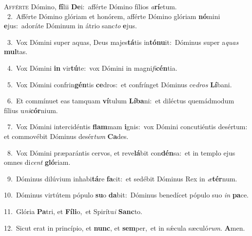 \lettrine{\initial\textcolor{\initialcolor}{A}}{fférte} Dómino, \textbf{fí}\-lii \textbf{De}\-i:~\star afférte Dómino fílios \textit{a}\-\textbf{rí}etum.\\
{\numbfont\textcolor{\numbcolor}{~2.}}~Afférte Dómino glóriam et honórem, afférte Dómino glóriam \textbf{nó}\-mini \textbf{e}\-jus:~\star adoráte Dóminum in átrio sanc\textit{to} \textbf{e}\-jus.\par
{\numbfont\textcolor{\numbcolor}{~3.}}~Vox Dómini super aquas, Deus majes\-\textbf{tá}\-tis in\-\textbf{tó}\-\textbf{nu}it:~\star Dóminus super a\textit{quas} \textbf{mul}\-tas.\par
{\numbfont\textcolor{\numbcolor}{~4.}}~Vox Dómini \textbf{in} vir\-\textbf{tú}\-te:~\star vox Dómini in magni\-\textit{fi}\-\textbf{cén}tia.\par
{\numbfont\textcolor{\numbcolor}{~5.}}~Vox Dómini confrin\-\textbf{gén}\-tis \textbf{ce}\-dros:~\star et confrínget Dóminus ce\textit{dros} \textbf{Lí}\-bani.\par
{\numbfont\textcolor{\numbcolor}{~6.}}~Et commínuet eas tamquam \textbf{ví}\-tulum \textbf{Lí}\-\textbf{ba}ni:~\star et diléctus quemádmodum fílius u\-\textit{ni}\-\textbf{cór}nium.\par
{\numbfont\textcolor{\numbcolor}{~7.}}~Vox Dómini intercidéntis \textbf{flam}\-mam \textbf{i}\-gnis:~\star vox Dómini concutiéntis desértum: et commovébit Dóminus desér\textit{tum} \textbf{Ca}\-des.\par
{\numbfont\textcolor{\numbcolor}{~8.}}~Vox Dómini præparántis cervos, et reve\-\textbf{lá}\-bit con\-\textbf{dén}\-sa:~\star et in templo ejus omnes di\textit{cent} \textbf{gló}\-riam.\par
{\numbfont\textcolor{\numbcolor}{~9.}}~Dóminus dilúvium inhabi\-\textbf{tá}\-re \textbf{fa}\-cit:~\star et sedébit Dóminus Rex in \textit{æ}\-\textbf{tér}num.\par
{\numbfont\textcolor{\numbcolor}{10.}}~Dóminus virtútem pópulo \textbf{su}\-o \textbf{da}\-bit:~\star Dóminus benedícet pópulo suo \textit{in} \textbf{pa}\-ce.\par
{\numbfont\textcolor{\numbcolor}{11.}}~Glória \textbf{Pa}\-tri, et \textbf{Fí}\-\textbf{li}o,~\star et Spirítu\textit{i} \textbf{Sanc}\-to.\par
{\numbfont\textcolor{\numbcolor}{12.}}~Sicut erat in princípio, et \textbf{nunc}\-, et \textbf{sem}\-per,~\star et in sǽcula sæculó\-\textit{rum}\-. \textbf{A}\-men.\par
